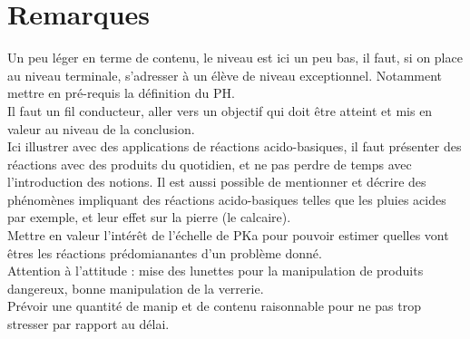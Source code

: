 \documentclass[12pt,prb,aps,epsf]{report}
\begin{document}
\section*{Remarques}
Un peu léger en terme de contenu, le niveau est ici un peu bas, il faut, si on place au niveau terminale, s'adresser à un élève de niveau exceptionnel. Notamment mettre en pré-requis la définition du PH.\\ Il faut un fil conducteur, aller vers un objectif qui doit être atteint et mis en valeur au niveau de la conclusion.\\ Ici illustrer avec des applications de réactions acido-basiques, il faut présenter des réactions avec des produits du quotidien, et ne pas perdre de temps avec l'introduction des notions. Il est aussi possible de mentionner et décrire des phénomènes impliquant des réactions acido-basiques telles que les pluies acides par exemple, et leur effet sur la pierre (le calcaire).\\
Mettre en valeur l'intérêt de l'échelle de PKa pour pouvoir estimer quelles vont êtres les réactions prédomianantes d'un problème donné.\\
Attention à l'attitude : mise des lunettes pour la manipulation de produits dangereux, bonne manipulation de la verrerie.\\
Prévoir une quantité de manip et de contenu raisonnable pour ne pas trop stresser par rapport au délai.
\end{document}
